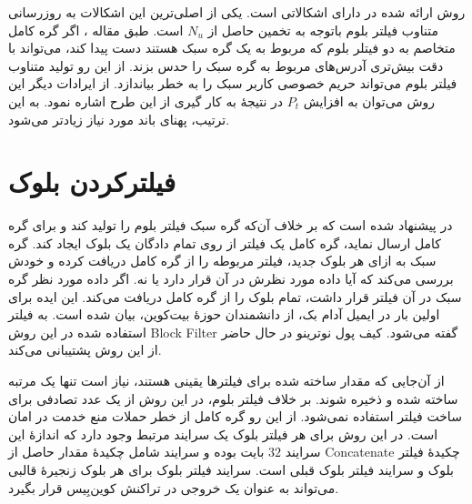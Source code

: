 روش ارائه شده در \cite{Kanemura2017} دارای اشکالاتی است. یکی از اصلی‌ترین این اشکالات به روزرسانی متناوب فیلتر بلوم باتوجه به تخمین حاصل از $N_u$  است. طبق مقاله \cite{Gervais2014}، اگر گره کامل متخاصم به دو فیتلر بلوم که مربوط به یک گره سبک هستند دست پیدا کند، می‌تواند با دقت بیش‌تری آدرس‌های مربوط به گره سبک را حدس بزند. از این رو تولید متناوب فیلتر بلوم می‌تواند حریم خصوصی کاربر سبک را به خطر بیاندازد.
از ایرادات دیگر این روش می‌توان به افزایش $P_t$ در نتیجهٔ به کار گیری از این طرح اشاره نمود. به این ترتیب، پهنای باند مورد نیاز زیادتر می‌شود. 

\section{فیلترکردن بلوک}
\label{BIP157}
در \cite{Osuntokun2017} پیشنهاد شده است که بر خلاف آن‌که گره سبک فیلتر بلوم را تولید کند و برای گره کامل ارسال نماید، گره کامل یک فیلتر از روی تمام دادگان یک بلوک ایجاد ‌کند. گره سبک به ازای هر بلوک جدید، فیلتر مربوطه را از گره کامل دریافت کرده و خودش بررسی می‌کند که آیا داده مورد نظرش در آن قرار دارد یا نه. اگر داده مورد نظر گره سبک در آن فیلتر قرار داشت، تمام بلوک را از گره کامل دریافت می‌کند. این ایده برای اولین بار در ایمیل آدام بک، از دانشمندان حوزهٔ بیت‌کوین، بیان شده است\cite{Back2015}. به فیلتر استفاده شده در این روش 
\gls{Block Filter}
 گفته می‌شود. کیف پول 
 نوترینو
در حال حاضر از این روش پشتیبانی می‌کند.

از آن‌جایی که مقدار ساخته شده برای فیلتر‌ها یقینی هستند، نیاز است تنها یک مرتبه ساخته شده و ذخیره شوند. بر خلاف فیلتر بلوم، در این روش از یک عدد تصادفی برای ساخت فیلتر استفاده نمی‌شود. از این رو گره کامل از خطر حملات منع خدمت در امان است. در این روش برای هر فیلتر بلوک یک سرایند مرتبط وجود دارد که اندازهٔ این سرایند $32$ بایت بوده و سرایند شامل چکیدهٔ مقدار حاصل از 
\gls{Concatenate}
چکیدهٔ فیلتر بلوک و سرایند فیلتر بلوک قبلی است. سرایند فیلتر بلوک برای هر بلوک زنجیرهٔ قالبی می‌تواند به عنوان یک خروجی  در تراکنش کوین‌بِیس قرار بگیرد. 

